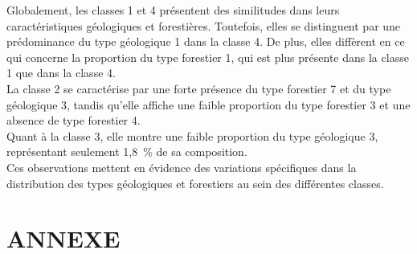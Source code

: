 \documentclass{article}
\begin{document}
Globalement, les classes 1 et 4 présentent des similitudes dans leurs caractéristiques géologiques et forestières. Toutefois, elles se distinguent par une prédominance du type géologique 1 dans la classe 4. De plus, elles diffèrent en ce qui concerne la proportion du type forestier 1, qui est plus présente dans la classe 1 que dans la classe 4.
\\
La classe 2 se caractérise par une forte présence du type forestier 7 et du type géologique 3, tandis qu'elle affiche une faible proportion du type forestier 3 et une absence de type forestier 4.
\\
Quant à la classe 3, elle montre une faible proportion du type géologique 3, représentant seulement 1,8~\% de sa composition.
\\
Ces observations mettent en évidence des variations spécifiques dans la distribution des types géologiques et forestiers au sein des différentes classes.


\newpage
\section{ANNEXE}





\end{document}
